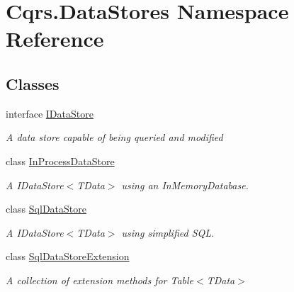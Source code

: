 \hypertarget{namespaceCqrs_1_1DataStores}{}\section{Cqrs.\+Data\+Stores Namespace Reference}
\label{namespaceCqrs_1_1DataStores}
\subsection*{Classes}
\begin{DoxyCompactItemize}
\item 
interface \hyperlink{interfaceCqrs_1_1DataStores_1_1IDataStore}{I\+Data\+Store}
\begin{DoxyCompactList}\small\item\em A data store capable of being queried and modified \end{DoxyCompactList}\item 
class \hyperlink{classCqrs_1_1DataStores_1_1InProcessDataStore}{In\+Process\+Data\+Store}
\begin{DoxyCompactList}\small\item\em A I\+Data\+Store$<$\+T\+Data$>$ using an In\+Memory\+Database. \end{DoxyCompactList}\item 
class \hyperlink{classCqrs_1_1DataStores_1_1SqlDataStore}{Sql\+Data\+Store}
\begin{DoxyCompactList}\small\item\em A I\+Data\+Store$<$\+T\+Data$>$ using simplified S\+QL. \end{DoxyCompactList}\item 
class \hyperlink{classCqrs_1_1DataStores_1_1SqlDataStoreExtension}{Sql\+Data\+Store\+Extension}
\begin{DoxyCompactList}\small\item\em A collection of extension methods for Table$<$\+T\+Data$>$ \end{DoxyCompactList}\end{DoxyCompactItemize}
